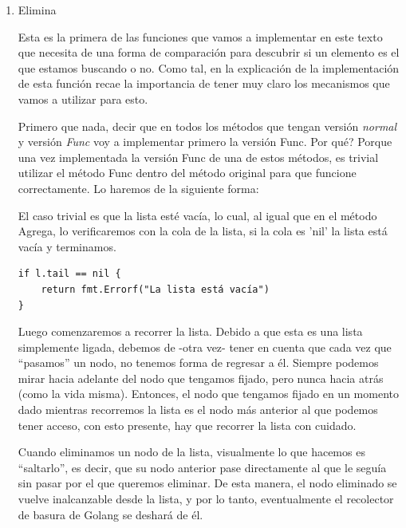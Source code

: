 \documentclass[11pt]{article}
\begin{document}
\begin{enumerate}
\begin{verbatim}
func (l *SinglyLinkedList[V]) Agrega(elemento V) (error){

n:= &nodoSimple[V]{elemento: elemento}
l.size++

if l.tail == nil {
<<caso1AgregaSLL>>
} else {
<<caso2AgregaSLL>>
}

return nil

}
\end{verbatim}
\item Elimina
\label{sec:org3c20ac8}

Esta es la primera de las funciones que vamos a implementar en este texto que necesita de una forma de comparación para descubrir si un elemento es el que estamos buscando o no. Como tal, en la explicación de la implementación de esta función recae la importancia de tener muy claro los mecanismos que vamos a utilizar para esto.

Primero que nada, decir que en todos los métodos que tengan versión \emph{normal} y versión \emph{Func} voy a implementar primero la versión Func. Por qué? Porque una vez implementada la versión Func de una de estos métodos, es trivial utilizar el método Func dentro del método original para que funcione correctamente. Lo haremos de la siguiente forma:

El caso trivial es que la lista esté vacía, lo cual, al igual que en el método Agrega, lo verificaremos con la cola de la lista, si la cola es 'nil' la lista está vacía y terminamos.

\begin{verbatim}
if l.tail == nil {
	return fmt.Errorf("La lista está vacía")
}
\end{verbatim}

Luego comenzaremos a recorrer la lista. Debido a que esta es una lista simplemente ligada, debemos de -otra vez- tener en cuenta que cada vez que ``pasamos'' un nodo, no tenemos forma de regresar a él. Siempre podemos mirar hacia adelante del nodo que tengamos fijado, pero nunca hacia atrás (como la vida misma). Entonces, el nodo que tengamos fijado en un momento dado mientras recorremos la lista es el nodo más anterior al que podemos tener acceso, con esto presente, hay que recorrer la lista con cuidado.

Cuando eliminamos un nodo de la lista, visualmente lo que hacemos es ``saltarlo'', es decir, que su nodo anterior pase directamente al que le seguía sin pasar por el que queremos eliminar. De esta manera, el nodo eliminado se vuelve inalcanzable desde la lista, y por lo tanto, eventualmente el recolector de basura de Golang se deshará de él.


\end{enumerate}
\end{document}
